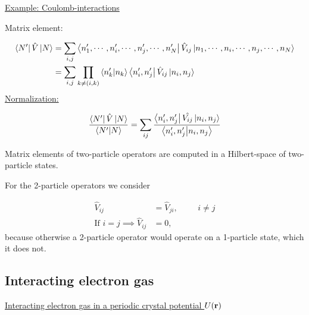 \noindent \uline{Example: Coulomb-interactions}

\noindent Matrix element:

\begin{align}
	\bra{N'} \hat{V} \ket{N} &= \sum_{i,j} \bra{n'_1, \cdots , n'_i, \cdots, n'_j, \cdots, n'_N} \hat{V}_{ij} \ket{n_1, \cdots , n_i, \cdots, n_j, \cdots, n_N}\\
	&= \sum_{i,j} \prod_{k\neq (i,k)} \braket{n'_k}{n_k} \bra{n'_i, n'_j} \hat{V}_{ij} \ket{n_i, n_j}
\end{align}
\noindent \uline{Normalization:}

\begin{equation}
	\frac{\bra{N'} \hat{V} \ket{N}}{\braket{N'}{N}} = \sum_{ij} \frac{\bra{n'_i, n'_j}\hat{V_{ij}}\ket{n_i, n_j}}{\braket{n'_i,n'_j}{n_i,n_j}}
\end{equation}

\begin{tcolorbox}
	Matrix elements of two-particle operators are computed in a Hilbert-space of two-particle states.
\end{tcolorbox}

\noindent For the 2-particle operators we consider

\begin{align}
	\hat{V}_{ij} &= \hat{V}_{ji}, \hspace{1cm} i \neq j\\
	\text{If } i=j \implies \hat{V}_{ij} &=0, \nonumber 
\end{align}
because otherwise a 2-particle operator would operate on a 1-particle state, which it does not.\\
\linebreak

\subsection{Interacting electron gas}
\noindent \uline{Interacting electron gas in a periodic crystal potential $U(\vb{r})$}



